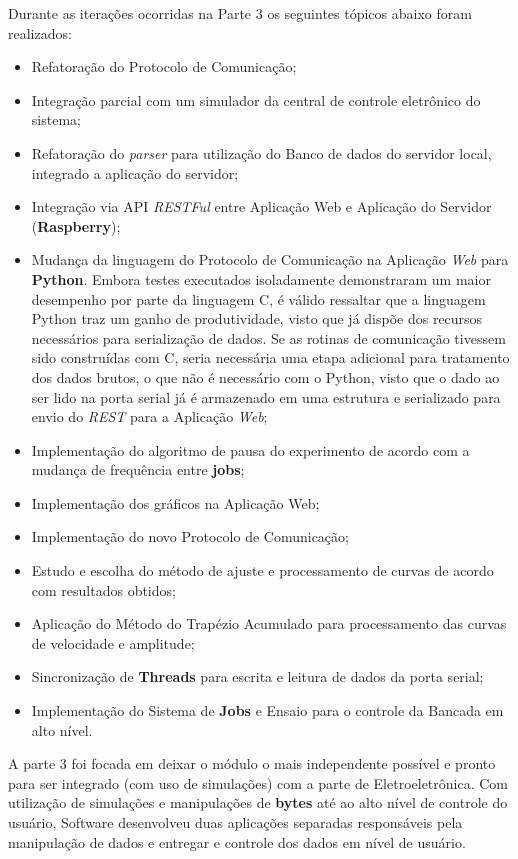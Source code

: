 Durante as iterações ocorridas na Parte 3 os seguintes tópicos abaixo foram realizados:

\begin{itemize}
  \item Refatoração do Protocolo de Comunicação;
  \item Integração parcial com um simulador da central de controle eletrônico do sistema;
  \item Refatoração do \textit{parser} para utilização do Banco de dados do servidor local, integrado a aplicação do servidor;
  \item Integração via API \textit{RESTFul} entre Aplicação Web e Aplicação do Servidor (\textbf{Raspberry});
  \item Mudança da linguagem do Protocolo de Comunicação na Aplicação \textit{Web} para \textbf{Python}. Embora testes executados isoladamente demonstraram um maior desempenho por parte da linguagem C, é válido ressaltar que a linguagem Python traz um ganho de produtividade, visto que já dispõe dos recursos necessários para serialização de dados. Se as rotinas de comunicação tivessem sido construídas com C, seria necessária uma etapa adicional para tratamento dos dados brutos, o que não é necessário com o Python, visto que o dado ao ser lido na porta serial já é armazenado em uma estrutura e serializado para envio do \textit{REST} para a Aplicação \textit{Web};
  \item Implementação do algoritmo de pausa do experimento de acordo com a mudança de frequência entre \textbf{jobs};
  \item Implementação dos gráficos na Aplicação Web;
  \item Implementação do novo Protocolo de Comunicação;
  \item Estudo e escolha do método de ajuste e processamento de curvas de acordo com resultados obtidos;
  \item Aplicação do Método do Trapézio Acumulado para processamento das curvas de velocidade e amplitude;
  \item Sincronização de \textbf{Threads} para escrita e leitura de dados da porta serial;
  \item Implementação do Sistema de \textbf{Jobs} e Ensaio para o controle da Bancada em alto nível.
\end{itemize}

A parte 3 foi focada em deixar o módulo o mais independente possível e pronto para ser integrado (com uso de simulações) com a parte de Eletroeletrônica. Com utilização de simulações e manipulações de \textbf{bytes} até ao alto nível de controle do usuário, Software desenvolveu duas aplicações separadas responsáveis pela manipulação de dados e entregar e controle dos dados em nível de usuário.

